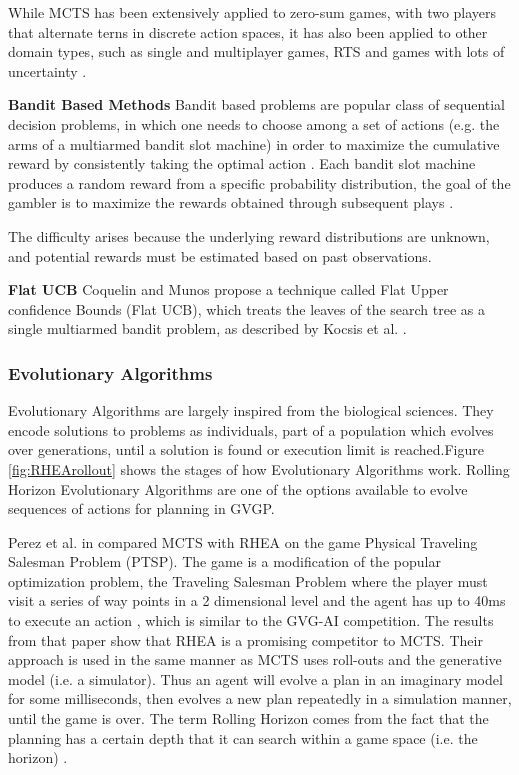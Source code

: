 \documentclass[journal]{IEEEtran}
\begin{document}
			While MCTS has been extensively applied to zero-sum games, with two players that alternate terns in discrete action spaces, it has also been applied to other domain types, such as single and multiplayer games, RTS and games with lots of uncertainty \cite{browne2012survey, de2016monte, frydenberg2015investigating}.

			\textbf{Bandit Based Methods}
				Bandit based problems are popular class of sequential decision problems, in which one needs to choose among a set of actions (e.g. the arms of a multiarmed bandit slot machine) in order to maximize the cumulative reward by consistently taking the optimal action \cite{kocsis2006bandit, coquelin2007bandit}.
				Each bandit slot machine produces a random reward from a specific probability distribution, the goal of the gambler is to maximize the rewards obtained through subsequent plays \cite{berry1985bandit, gaina2017rolling}.

				The difficulty arises because the underlying reward distributions are unknown, and potential rewards must be estimated based on past observations.
			
			\textbf{Flat UCB}
				Coquelin and Munos propose a technique called Flat Upper confidence Bounds (Flat UCB), which treats the leaves of the search tree as a single multiarmed bandit problem, as described by Kocsis et al. \cite{kocsis2006bandit}.

			

		



		\subsubsection{Evolutionary Algorithms} \label{sssec:EA}
			Evolutionary Algorithms are largely inspired from the biological sciences. They encode solutions to problems as individuals, part of a population which evolves over generations, until a solution is found or execution limit is reached.Figure \ref{fig:RHEArollout} shows the stages of how Evolutionary Algorithms work.
			Rolling Horizon Evolutionary Algorithms are one of the options available to evolve sequences of actions for planning in GVGP.

			Perez et al. in \cite{perez2013rolling} compared MCTS with RHEA on the game Physical Traveling Salesman Problem (PTSP). The game is a modification of the popular optimization problem, the Traveling Salesman Problem \cite{flood1956traveling} where the player must visit a series of way points in a 2 dimensional level and the agent has up to 40ms to execute an action \cite{perez2013rolling}, which is similar to the GVG-AI competition.  The results from that paper show that RHEA is a promising competitor to MCTS.
			Their approach is used in the same manner as MCTS uses roll-outs and the generative model (i.e. a simulator). Thus an agent will evolve a plan in an imaginary model for some milliseconds, then evolves a new plan repeatedly in a simulation manner, until the game is over.
			The term Rolling Horizon comes from the fact  that the planning has a certain depth that it can search within a game space  (i.e. the horizon) \cite{gaina2017analysis, gaina2017rolling}.
			
\end{document}
